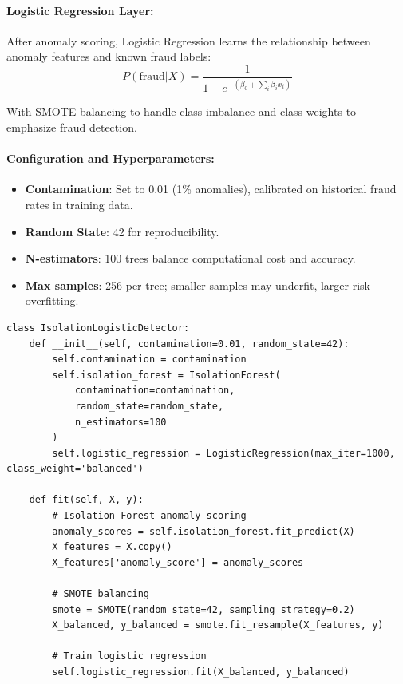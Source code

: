 \documentclass[11pt,a4paper]{article}
\begin{document}
\paragraph{Logistic Regression Layer:}
After anomaly scoring, Logistic Regression learns the relationship between anomaly features and known fraud labels:
\begin{equation}
P(\text{fraud}|X) = \frac{1}{1 + e^{-(\beta_0 + \sum_{i} \beta_i x_i)}}
\end{equation}

With SMOTE balancing to handle class imbalance and class weights to emphasize fraud detection.

\paragraph{Configuration and Hyperparameters:}
\begin{itemize}
    \item \textbf{Contamination}: Set to 0.01 (1\% anomalies), calibrated on historical fraud rates in training data.
    \item \textbf{Random State}: 42 for reproducibility.
    \item \textbf{N-estimators}: 100 trees balance computational cost and accuracy.
    \item \textbf{Max samples}: 256 per tree; smaller samples may underfit, larger risk overfitting.
\end{itemize}

\begin{lstlisting}[caption=Isolation Forest + Logistic Regression Implementation, basicstyle=\ttfamily\tiny]
class IsolationLogisticDetector:
    def __init__(self, contamination=0.01, random_state=42):
        self.contamination = contamination
        self.isolation_forest = IsolationForest(
            contamination=contamination,
            random_state=random_state,
            n_estimators=100
        )
        self.logistic_regression = LogisticRegression(max_iter=1000, class_weight='balanced')

    def fit(self, X, y):
        # Isolation Forest anomaly scoring
        anomaly_scores = self.isolation_forest.fit_predict(X)
        X_features = X.copy()
        X_features['anomaly_score'] = anomaly_scores

        # SMOTE balancing
        smote = SMOTE(random_state=42, sampling_strategy=0.2)
        X_balanced, y_balanced = smote.fit_resample(X_features, y)
        
        # Train logistic regression
        self.logistic_regression.fit(X_balanced, y_balanced)
\end{lstlisting}
\end{document}
